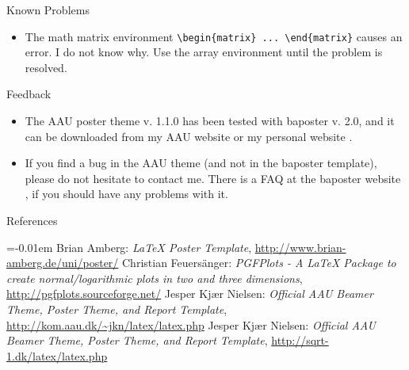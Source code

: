 \documentclass[a0paper,portrait]{baposter}
\begin{document}
\begin{poster}
\begin{posterbox}[name=problems,column=2,below=install]{Known Problems}
  \begin{itemize}
    \item The math matrix environment {\tt \textbackslash begin\{matrix\} ... \textbackslash end\{matrix\}} causes an error. I do not know why. Use the array environment until the problem is resolved.
  \end{itemize}
\end{posterbox}

\begin{posterbox}[name=feedback,column=2,below=problems]{Feedback}
  \begin{itemize}
    \item The AAU poster theme v. 1.1.0 has been tested with baposter v. 2.0, and it can be downloaded from my AAU website \cite{jknaau} or my personal website \cite{jknsqrt-1}.
    \item If you find a bug in the AAU theme (and not in the baposter template), please do not hesitate to contact me. There is a FAQ at the baposter website \cite{baposter}, if you should have any problems with it.
  \end{itemize}
\end{posterbox}

\begin{posterbox}[name=refs,column=2,below=feedback,above=bottom]{References}


\begin{thebibliography}{1}%
\itemsep=-0.01em%
\setlength{\baselineskip}{0.4em}%
 Brian Amberg: \emph{LaTeX Poster Template}, \url{http://www.brian-amberg.de/uni/poster/} 
 Christian Feuersänger: \emph{PGFPlots - A LaTeX Package to create normal/logarithmic plots in two and three dimensions}, \url{http://pgfplots.sourceforge.net/} 
 Jesper Kjær Nielsen: \emph{Official AAU Beamer Theme, Poster Theme, and Report Template}, \url{http://kom.aau.dk/~jkn/latex/latex.php}
 Jesper Kjær Nielsen: \emph{Official AAU Beamer Theme, Poster Theme, and Report Template}, \url{http://sqrt-1.dk/latex/latex.php}
\end{thebibliography}


%  
%   
\end{posterbox}

\end{poster}
\end{document}
